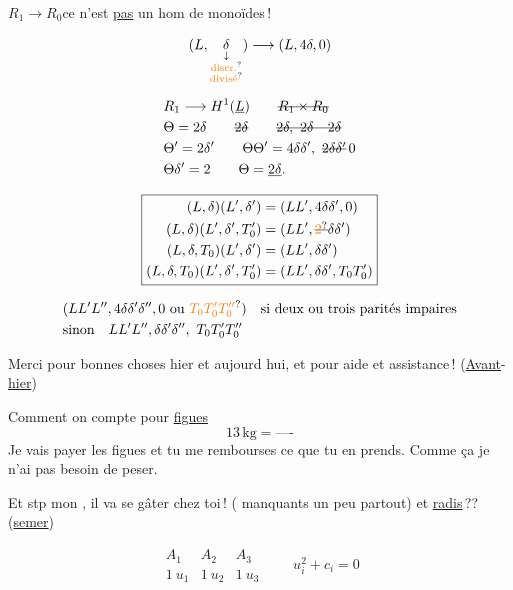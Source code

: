 $R_1\longrightarrow R_0$\qquad ce n'est \uline{pas} un hom de monoïdes\,!

\[
(L,\underset{\substack{\downarrow\\\text{\unsure{discr.}}\\\text{\unsure{divisé}}}}{\delta})\longrightarrow (L,4\delta,0)
\]

\[
\begin{aligned}
&R_1\longrightarrow H^1(\underline L)\qquad \deleted{R_1\times R_0}\\
&\Theta=2\delta\qquad\deleted{2\delta}\qquad\deleted{2\delta,\ 2\delta\quad 2\delta}\\
&\Theta'=2\delta'\qquad\Theta\Theta'=4\delta\delta',\ \deleted{2\delta\delta'}\,0\\
&\Theta\delta'=2\qquad\Theta=\underline{2\delta}.
\end{aligned}
\]

\[
\boxed{\begin{aligned}
(L,\delta)(L',\delta')&=(LL',4\delta\delta',0)\\
(L,\delta)(L',\delta',T'_0)&=(LL',\deleted{\unsure{2}}\delta\delta')\\
(L,\delta,T_0)(L',\delta')&=(LL',\delta\delta')\\
(L,\delta,T_0)(L',\delta',T'_0)&=(LL',\delta\delta',T_0T'_0)
\end{aligned}}
\]

\[
\begin{aligned}
&(LL'L'',4\delta\delta'\delta'',0\ \text{ou }\unsure{T_0T'_0T''_0})\quad \text{si deux ou trois parités impaires}\\
&\text{sinon}\quad LL'L'',\delta\delta'\delta'',\ T_0T'_0T''_0
\end{aligned}
\]

Merci pour bonnes choses  hier et aujourd hui, et pour aide et assistance\,! (\uline{Avant}-\uline{hier})

Comment on compte pour \uline{figues}
\[13\,\mathrm{kg}=\text{----}\]
Je vais payer les figues et tu me rembourses ce que tu en prends. Comme ça je n'ai pas besoin de peser.

Et  stp mon , il va se gâter chez toi\,!  \uline{} ( manquants un peu partout) et \uline{radis}\,?? (\uline{semer})

\[
\begin{array}{ccc}
A_1&A_2&A_3\\
1\ u_1&1\ u_2&1\ u_3
\end{array}
\qquad u_i^2+c_i=0
\]

